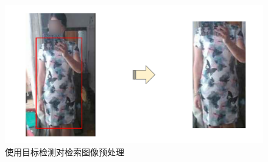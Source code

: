 \begin{figure}[h]
  \centering
  \includegraphics[width=0.8\linewidth]{Img/im-det.pdf}
  \caption{使用目标检测对检索图像预处理}
  \label{fig:im-det}
\end{figure}
